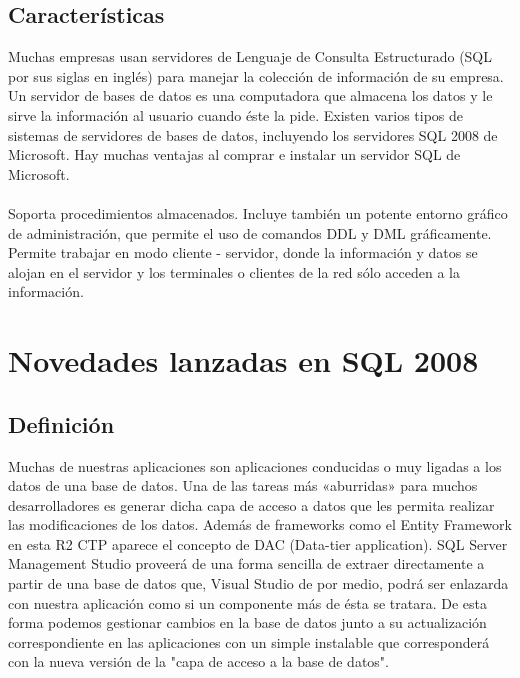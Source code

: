 \documentclass[preprint,12pt]{elsarticle}
\begin{document}
\subsection{Características}
Muchas empresas usan servidores de Lenguaje de Consulta Estructurado (SQL por sus siglas en inglés) para manejar la colección de información de su empresa. Un servidor de bases de datos es una computadora que almacena los datos y le sirve la información al usuario cuando éste la pide. Existen varios tipos de sistemas de servidores de bases de datos, incluyendo los servidores SQL 2008 de Microsoft. Hay muchas ventajas al comprar e instalar un servidor SQL de Microsoft.
\\
\\
Soporta procedimientos almacenados. Incluye también un potente entorno gráfico de administración, que permite el uso de comandos DDL y DML gráficamente. Permite trabajar en modo cliente - servidor, donde la información y datos se alojan en el servidor y los terminales o clientes de la red sólo acceden a la información.

\section{Novedades lanzadas en SQL 2008}

\subsection{Definición}
Muchas de nuestras aplicaciones son aplicaciones conducidas o muy ligadas a los datos de una base de datos. Una de las tareas más «aburridas» para muchos desarrolladores es generar dicha capa de acceso a datos que les permita realizar las modificaciones de los datos. Además de frameworks como el Entity Framework en esta R2 CTP aparece el concepto de DAC (Data-tier application). SQL Server Management Studio proveerá de una forma sencilla de extraer directamente a partir de una base de datos que, Visual Studio de por medio, podrá ser enlazarda con nuestra aplicación como si un componente más de ésta se tratara. De esta forma podemos gestionar cambios en la base de datos junto a su actualización correspondiente en las aplicaciones con un simple instalable que corresponderá con la nueva versión de la "capa de acceso a la base de datos".
\\
\\
\end{document}

